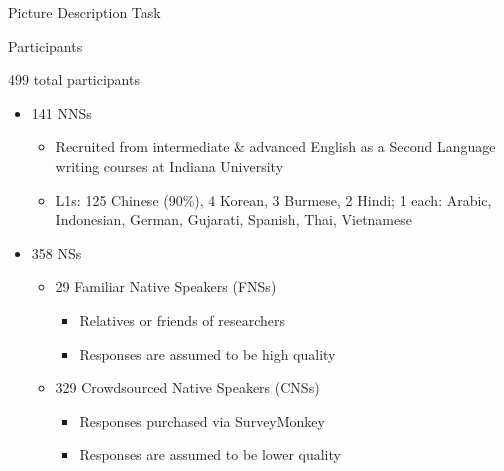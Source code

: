 \documentclass[final,t]{beamer}
\begin{document}
\begin{frame}{}
\begin{columns}[t]
\begin{column}{.33\linewidth}
\begin{block}{Picture Description Task}
\begin{center}
\begin{minipage}{.85\textwidth}
\end{minipage}
\end{center}
\vspace{-.5em}
\end{block}


\begin{block}{Participants}

\begin{center}
\begin{minipage}{.85\textwidth}
499 total participants
	\begin{itemize}
		\item 141 NNSs
		\begin{itemize}
			\item Recruited from intermediate \& advanced English as a Second Language writing courses at Indiana University
			\item L1s: 125 Chinese (90\%), 4 Korean, 3 Burmese, 2 Hindi; 1 each: Arabic, Indonesian, German, Gujarati, Spanish, Thai, Vietnamese
		\end{itemize}
		\item 358 NSs
		\begin{itemize}
			\item 29 Familiar Native Speakers (FNSs)
			\begin{itemize}
				\item Relatives or friends of researchers
				\item Responses are assumed to be high quality
			\end{itemize}
			\item 329 Crowdsourced Native Speakers (CNSs)
			\begin{itemize}
				\item Responses purchased via SurveyMonkey
				\item Responses are assumed to be lower quality
			\end{itemize}
		\end{itemize}
	\end{itemize}
\end{minipage}
\end{center}
\vspace{-.5em}
\end{block}
\end{column}


\end{columns}
\end{frame}
\end{document}
